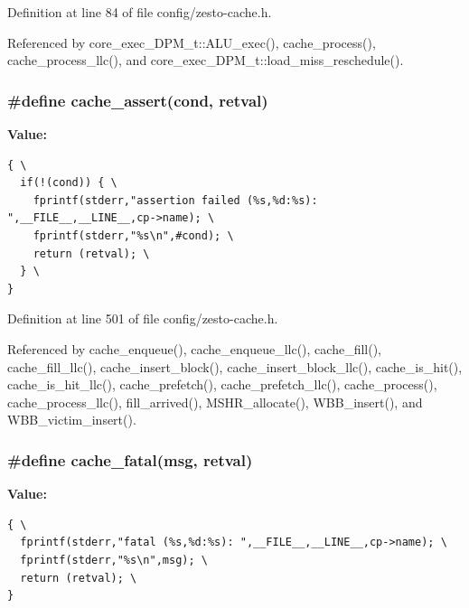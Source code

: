 Definition at line 84 of file config/zesto-cache.h.

Referenced by core\_\-exec\_\-DPM\_\-t::ALU\_\-exec(), cache\_\-process(), cache\_\-process\_\-llc(), and core\_\-exec\_\-DPM\_\-t::load\_\-miss\_\-reschedule().
\subsubsection[{cache\_\-assert}]{\setlength{\rightskip}{0pt plus 5cm}\#define cache\_\-assert(cond, \/  retval)}\label{config_2zesto-cache_8h_353f3b46190659b8825fac08a8eb7938}


\textbf{Value:}

\begin{Code}\begin{verbatim}{ \
  if(!(cond)) { \
    fprintf(stderr,"assertion failed (%s,%d:%s): ",__FILE__,__LINE__,cp->name); \
    fprintf(stderr,"%s\n",#cond); \
    return (retval); \
  } \
}
\end{verbatim}
\end{Code}


Definition at line 501 of file config/zesto-cache.h.

Referenced by cache\_\-enqueue(), cache\_\-enqueue\_\-llc(), cache\_\-fill(), cache\_\-fill\_\-llc(), cache\_\-insert\_\-block(), cache\_\-insert\_\-block\_\-llc(), cache\_\-is\_\-hit(), cache\_\-is\_\-hit\_\-llc(), cache\_\-prefetch(), cache\_\-prefetch\_\-llc(), cache\_\-process(), cache\_\-process\_\-llc(), fill\_\-arrived(), MSHR\_\-allocate(), WBB\_\-insert(), and WBB\_\-victim\_\-insert().
\subsubsection[{cache\_\-fatal}]{\setlength{\rightskip}{0pt plus 5cm}\#define cache\_\-fatal(msg, \/  retval)}\label{config_2zesto-cache_8h_49d297d9664074880fe05898300c0389}


\textbf{Value:}

\begin{Code}\begin{verbatim}{ \
  fprintf(stderr,"fatal (%s,%d:%s): ",__FILE__,__LINE__,cp->name); \
  fprintf(stderr,"%s\n",msg); \
  return (retval); \
}
\end{verbatim}
\end{Code}


